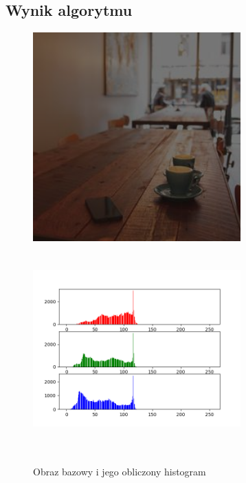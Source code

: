 \documentclass[a4paper,12pt]{book}
\begin{document}
\subsection*{Wynik algorytmu}
\begin{figure}[H]
	\caption{Obraz bazowy i jego obliczony histogram}
	\includegraphics[width=8cm, height=8cm]{coffee-dark-unmodified.png}
	\includegraphics[width=8cm, height=8cm]{6-1/calculate-coffee-dark.png}
	

\end{figure}
\end{document}
